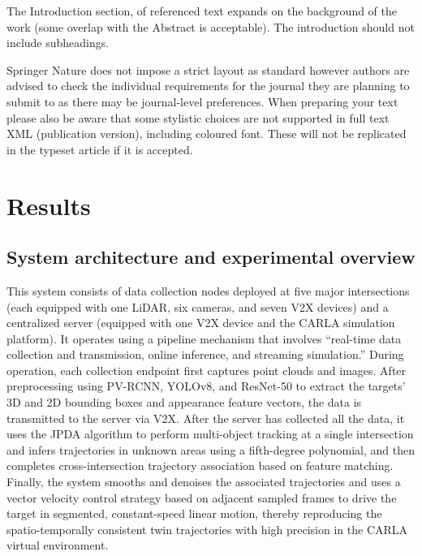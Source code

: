 \documentclass[lineno,pdflatex,sn-basic]{sn-jnl}%
\theoremstyle{thmstyleone}%
\theoremstyle{thmstyletwo}%
\theoremstyle{thmstylethree}%
\begin{document}
The Introduction section, of referenced text \cite{bib1} expands on the background of the work (some overlap with the Abstract is acceptable). The introduction should not include subheadings.

Springer Nature does not impose a strict layout as standard however authors are advised to check the individual requirements for the journal they are planning to submit to as there may be journal-level preferences. When preparing your text please also be aware that some stylistic choices are not supported in full text XML (publication version), including coloured font. These will not be replicated in the typeset article if it is accepted. 

\section{Results}\label{sec2}

\subsection{System architecture and experimental overview}
This system consists of data collection nodes deployed at five major intersections (each equipped with one LiDAR, six cameras, and seven V2X devices) and a centralized server (equipped with one V2X device and the CARLA simulation platform). It operates using a pipeline mechanism that involves “real-time data collection and transmission, online inference, and streaming simulation.”
During operation, each collection endpoint first captures point clouds and images. After preprocessing using PV-RCNN, YOLOv8, and ResNet-50 to extract the targets’ 3D and 2D bounding boxes and appearance feature vectors, the data is transmitted to the server via V2X.
After the server has collected all the data, it uses the JPDA algorithm to perform multi-object tracking at a single intersection and infers trajectories in unknown areas using a fifth-degree polynomial, and then completes cross-intersection trajectory association based on feature matching.
Finally, the system smooths and denoises the associated trajectories and uses a vector velocity control strategy based on adjacent sampled frames to drive the target in segmented, constant-speed linear motion, thereby reproducing the spatio-temporally consistent twin trajectories with high precision in the CARLA virtual environment.
\end{document}
